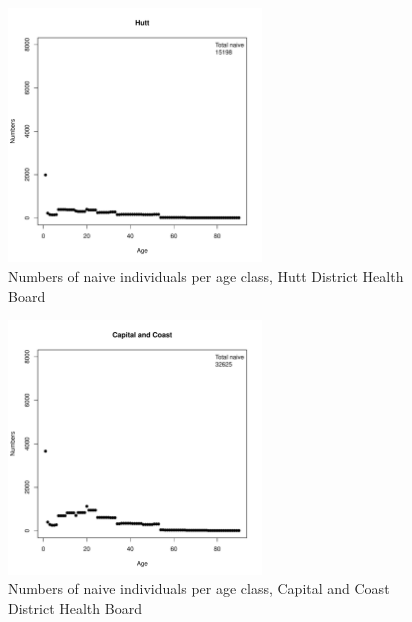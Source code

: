 \documentclass{article}
\begin{document}
\begin{figure}
     \begin{center}
     \includegraphics[width=0.6\textwidth]{dhb13.pdf}
     \end{center}
     \caption{Numbers of naive individuals per age class, Hutt District Health Board}
     \label{fig:Hutt}
\end{figure}

\begin{figure}
     \begin{center}
     \includegraphics[width=0.6\textwidth]{dhb14.pdf}
     \end{center}
     \caption{Numbers of naive individuals per age class, Capital and Coast District Health Board}
     \label{fig:CapitalandCoast}
\end{figure}
\end{document}
